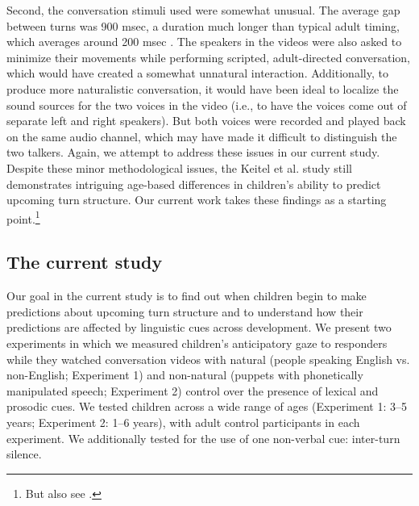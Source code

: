 \documentclass[authoryear, 12pt]{elsarticle}
\begin{document}
Second, the conversation stimuli \citet{keitel2013} used were somewhat unusual. The average gap between turns was 900 msec, a duration much longer than typical adult timing, which averages around 200 msec \citep{stivers2009}. The speakers in the videos were also asked to minimize their movements while performing scripted, adult-directed conversation, which would have created a somewhat unnatural interaction. Additionally, to produce more naturalistic conversation, it would have been ideal to localize the sound sources for the two voices in the video (i.e., to have the voices come out of separate left and right speakers). But both voices were recorded and played back on the same audio channel, which may have made it difficult to distinguish the two talkers. Again, we attempt to address these issues in our current study. Despite these minor methodological issues, the Keitel et al. \citeyearpar{keitel2013} study still demonstrates intriguing age-based differences in children's ability to predict upcoming turn structure. Our current work takes these findings as a starting point.\footnote{But also see \citet{casillas2012, casillas2013}.}


\subsection*{The current study}

Our goal in the current study is to find out when children begin to make predictions about upcoming turn structure and to understand how their predictions are affected by linguistic cues across development. We present two experiments in which we measured children's anticipatory gaze to responders while they watched conversation videos with natural (people speaking English vs. non-English; Experiment 1) and non-natural (puppets with phonetically manipulated speech; Experiment 2) control over the presence of lexical and prosodic cues. We tested children across a wide range of ages (Experiment 1: 3--5 years; Experiment 2: 1--6 years), with adult control participants in each experiment. We additionally tested for the use of one non-verbal cue: inter-turn silence.
\end{document}
